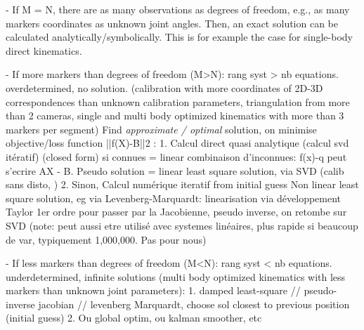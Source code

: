 - If M = N, there are as many observations as degrees of freedom, e.g., as many markers coordinates as unknown joint angles. Then, an exact solution can be calculated analytically/symbolically. This is for example the case for single-body direct kinematics.

- If more markers than degrees of freedom (M>N): rang syst > nb equations. overdetermined, no solution. (calibration with more coordinates of 2D-3D correspondences than unknown calibration parameters, triangulation from more than 2 cameras, single and multi body optimized kinematics with more than 3 markers per segment)
Find \emph{approximate / optimal} solution, on minimise objective/loss function ||f(X)-B||2 :
1. Calcul direct quasi analytique (calcul svd itératif) (closed form) si connues = linear combinaison d'inconnues: f(x)-q peut s'ecrire AX - B. 
Pseudo solution = linear least square solution, via SVD
(calib sans disto, )
2. Sinon, Calcul numérique iteratif from initial guess
Non linear least square solution, eg via Levenberg-Marquardt: linearisation via développement Taylor 1er ordre pour passer par la Jacobienne, pseudo inverse, on retombe sur SVD
(note: peut aussi etre utilisé avec systemes linéaires, plus rapide si beaucoup de var, typiquement 1,000,000. Pas pour nous)



- If less markers than degrees of freedom (M<N): rang syst < nb equations. underdetermined, infinite solutions
(multi body optimized kinematics with less markers than unknown joint parameters): 
1. damped least-square // pseudo-inverse jacobian // levenberg Marquardt, choose sol closest to previous position (initial guess)
2. Ou global optim, ou kalman smoother, etc







